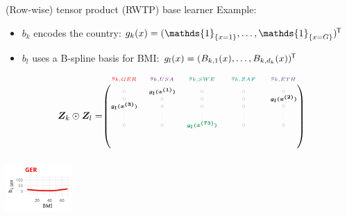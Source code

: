 \documentclass[t,10pt]{beamer}
\begin{document}
\begin{frame}{(Row-wise) tensor product (RWTP) base learner}
  Example:
  \begin{itemize}
    \item $b_k$ encodes the country: $g_k(x) = (\mathds{1}_{\{x = 1\}}, \dots, \mathds{1}_{\{x = G\}})^\tran$
    \item $b_l$ uses a B-spline basis for BMI: $g_l(x) = (B_{k,1}(x), \dots, B_{k,d_k}(x))^{\mkern-1.5mu\mathsf{T}}$
  \end{itemize}
  $$
    \design_k \odot \design_l = \tiny\begin{blockarray}{ccccc}
      \color[HTML]{EE0000}g_{k,GER} & \color[HTML]{631879}g_{k,USA} & \color[HTML]{008B45}g_{k,SWE} & \color[HTML]{008280}g_{k,ZAF} & \color[HTML]{3B4992}g_{k,ETH}\\
    \begin{block}{(ccccc)}
      \phantom{x}\\
      \color{lightgray}0 & \color{black}\bm{g_l(x^{(1)})} & \color{lightgray}0 & \color{lightgray}0 & \color{lightgray}0 \\
      \color{lightgray}0 & \color{lightgray}0 & \color{lightgray}0 & \color{lightgray}0 & \color{black}\bm{g_l(x^{(2)})} \\
      \color{black}\bm{g_l(x^{(3)})} & \color{lightgray}0 & \color{lightgray}0 & \color{lightgray}0 & \color{lightgray}0 \\
      \color{lightgray}\vdots & \color{lightgray}\vdots & \color{lightgray}\vdots & \color{lightgray}\vdots & \color{lightgray}\vdots \\
      \color{lightgray}0 & \color{lightgray}0 & \color[HTML]{008B45}\bm{g_l(x^{(73)})} & \color{lightgray}0 & \color{lightgray}0 \\
      \color{white}0 & \color{white}0 & \color{white}0 & \color{white}\bm{g_l(x^{(74)})} & \color{white}0 \\
      \color{white}0 & \color{white}0 & \color{white}\bm{g_l(x^{(75)})} & \color{white}0 & \color{white}0 \\
      \phantom{x}\\
    \end{block}
  \end{blockarray}
  $$
  \normalsize
  {\includegraphics[width=0.19\textwidth]{figures/bs-tensor/fig-tensor-GER.png}}

\end{frame}
\end{document}

